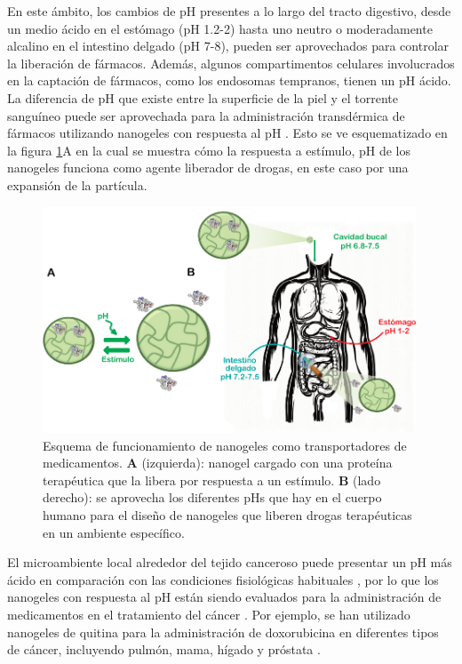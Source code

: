 En este \'ambito, los cambios de pH presentes a lo largo del tracto digestivo, desde un medio \'acido en el est\'omago (pH 1.2-2) hasta uno neutro o moderadamente alcalino en el intestino delgado (pH 7-8), pueden ser aprovechados para controlar la liberaci\'on de f\'armacos.
Adem\'as, algunos compartimentos celulares involucrados en la captaci\'on de f\'armacos, como los endosomas tempranos, tienen un pH \'acido. La diferencia de pH que existe entre la superficie de la piel y el torrente sangu\'ineo puede ser aprovechada para la administraci\'on transd\'ermica de f\'armacos utilizando nanogeles con respuesta al pH \cite{qindeel2019development}.
Esto se ve esquematizado en la figura \ref{fig:intro:sistema}A en la cual se muestra c\'omo la respuesta a est\'imulo, pH  de los nanogeles funciona como agente liberador de drogas, en este caso por una expansi\'on de la part\'icula.


\begin{figure}
	\centering
	\includegraphics[width=0.99\textwidth]{Figures/modelos/sistema.pdf}
	\caption{Esquema de funcionamiento de nanogeles como transportadores de medicamentos. 
		\textbf{A} (izquierda): nanogel cargado con una prote\'ina terap\'eutica que la libera por respuesta a un est\'imulo. \textbf{B} (lado derecho): se aprovecha los diferentes pHs que hay en el cuerpo humano para el dise\~no de nanogeles que liberen drogas terap\'euticas en un ambiente espec\'ifico. }
	\label{fig:intro:sistema}
\end{figure}

El microambiente local alrededor del tejido canceroso puede presentar un pH m\'as \'acido en comparaci\'on con las condiciones fisiol\'ogicas habituales \cite{lawson1963breast,tannock1989acid,gerweck2006tumor}, por lo que los nanogeles con respuesta al pH est\'an siendo evaluados para la administraci\'on de medicamentos en el tratamiento del c\'ancer \cite{peng2013controlled,kanamala2016mechanisms}. Por ejemplo, se han utilizado nanogeles de quitina para la administraci\'on de doxorubicina en diferentes tipos de c\'ancer, incluyendo pulm\'on, mama, h\'igado y pr\'ostata \cite{jayakumar2012doxorubicin}.

